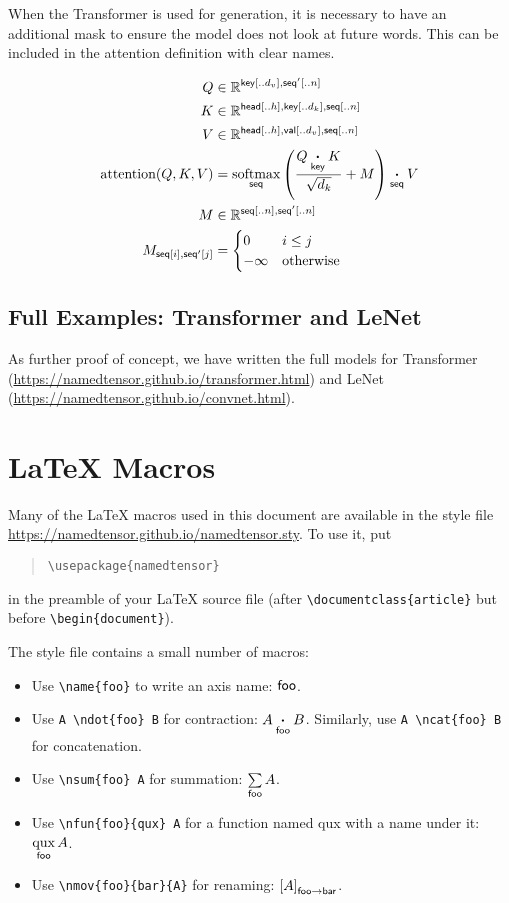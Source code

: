\documentclass{article}
\newcommand{\reals}{\mathbb{R}}
\begin{document}
When the Transformer is used for generation, it is necessary to have
an additional mask to ensure the model does not look at future words.
This can be included in the attention definition with clear names.

\begin{align*} 
Q &\in \reals^{\nset{key}{..d_v},\nset{seq'}{..n}}\\
K &\in \reals^{\nset{head}{..h},\nset{key}{..d_k}, \nset{seq}{..n}}\\
V &\in \reals^{\nset{head}{..h}, \nset{val}{..d_v}, \nset{seq}{..n}}\\
\text{attention}(Q, K, V) &=  \nfun{seq}{softmax} \left( \frac{Q \ndot{key} K}{\sqrt{d_k}} + M \right) \ndot{seq} V \\
M & \in \reals^{\nset{seq}{..n}, \nset{seq'}{..n}} \\
M_{\nidx{seq}{i}, \nidx{seq'}{j}} & = \begin{cases}0 & i \leq j\\
-\infty & \text{otherwise} \end{cases} \\
\end{align*}


\subsection{Full Examples: Transformer and LeNet}

As further proof of concept, we have written the full models for Transformer (\url{https://namedtensor.github.io/transformer.html}) and LeNet (\url{https://namedtensor.github.io/convnet.html}).

\section{\LaTeX{} Macros}

Many of the \LaTeX{} macros used in this document are available in the style file \url{https://namedtensor.github.io/namedtensor.sty}. To use it, put
\begin{quote}
\begin{verbatim}
\usepackage{namedtensor}
\end{verbatim}
\end{quote}
in the preamble of your \LaTeX{} source file (after \verb|\documentclass{article}| but before \verb|\begin{document}|).

The style file contains a small number of macros:
\begin{itemize}
\item Use \verb|\name{foo}| to write an axis name: $\name{foo}$.
\item Use \verb|A \ndot{foo} B| for contraction: $A \ndot{foo} B$. Similarly, use \verb|A \ncat{foo} B| for concatenation.
\item Use \verb|\nsum{foo} A| for summation: $\nsum{foo} A$.
\item Use \verb|\nfun{foo}{qux} A| for a function named qux with a name under it: $\nfun{foo}{qux} A$.
\item Use \verb|\nmov{foo}{bar}{A}| for renaming: $\nmov{foo}{bar}{A}$.
\end{itemize}
\end{document}

